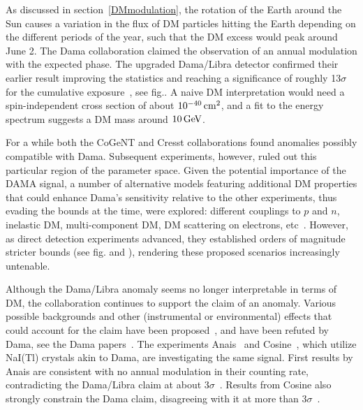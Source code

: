 As discussed in section~\ref{DMmodulation}, the rotation of the Earth around the Sun
causes a variation in the flux of DM particles hitting the Earth depending on the different periods of the year, 
such that the DM excess would peak around June 2.
The {\sc Dama} collaboration claimed the observation of an annual modulation with the expected phase.
The upgraded {\sc Dama/Libra} detector confirmed their earlier result 
improving the statistics and reaching a significance of roughly 13$\sigma$ for the cumulative exposure~\cite{DAMA,DAMA/LIBRA}, see fig..
A naive DM interpretation would need a spin-independent cross section of about $10^{-40}\,{\rm cm}^2$,
and a fit to the energy spectrum suggests a DM mass around $10\,{\rm GeV}$.



\smallskip

For a while both the {\sc CoGeNT} and {\sc Cresst} collaborations found anomalies possibly compatible with {\sc Dama}.
Subsequent experiments, however, ruled out this particular region of the parameter space.
Given the potential importance of the DAMA signal, a number of alternative models featuring additional DM properties that could enhance {\sc Dama}'s sensitivity relative to the other experiments, thus evading the bounds at the time, were explored: 
different couplings to $p$ and $n$, inelastic DM, multi-component  DM, DM scattering on electrons,  etc~\cite{DAMA_DMexplanations}.
However, as direct detection experiments advanced, they established orders of magnitude stricter bounds
(see fig. and ),
rendering these proposed scenarios increasingly untenable.

\medskip

Although the {\sc Dama/Libra} anomaly seems no longer interpretable in terms of DM, the collaboration continues to support the claim of an anomaly. Various possible backgrounds and other (instrumental or environmental) effects that could account for the claim have been proposed~\cite{DAMAanomaly:alternatives}, and have been refuted by {\sc Dama}, see the {\sc Dama} papers~\cite{DAMA}.
The experiments {\sc Anais}~\cite{ANAIS} and {\sc Cosine}~\cite{COSINE}, which utilize NaI(Tl) crystals akin to {\sc Dama},  are investigating the same signal. 
First results by {\sc Anais} are consistent with no annual modulation in their counting rate, 
contradicting the {\sc Dama/Libra} claim at about $3\sigma$~\cite{ANAIS}.
Results from {\sc Cosine} also strongly constrain the {\sc Dama} claim, disagreeing with it at more than $3\sigma$~\cite{COSINE}.

